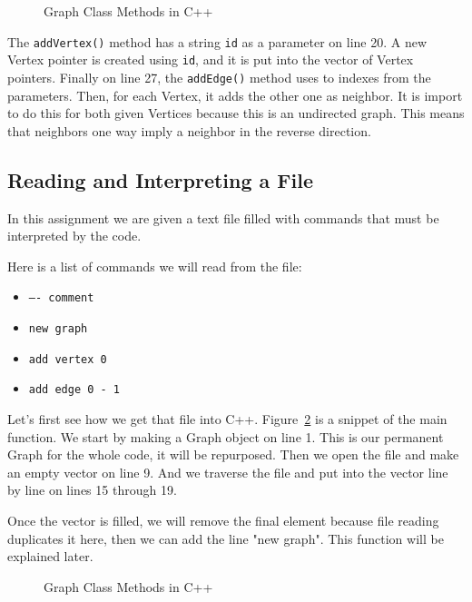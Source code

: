 \documentclass[letterpaper, 10pt,DIV=13]{scrartcl}
\numberwithin{equation}{section} %
\numberwithin{figure}{section} %
\numberwithin{table}{section} %
\begin{document}
\begin{figure}[ht] 
    \centering 
    
    \caption{Graph Class Methods in C++}
    \label{figure:GraphMethods}
\end{figure}


The \texttt{addVertex()} method has a string \texttt{id} as a parameter on line 20. A new Vertex pointer is created using \texttt{id}, and it is put into the vector of Vertex pointers. Finally on line 27, the \texttt{addEdge()} method uses to indexes from the parameters. Then, for each Vertex, it adds the other one as neighbor. It is import to do this for both given Vertices because this is an undirected graph. This means that neighbors one way imply a neighbor in the reverse direction.


\subsection{Reading and Interpreting a File}
In this assignment we are given a text file filled with commands that must be interpreted by the code. 

Here is a list of commands we will read from the file:
\begin{itemize}
    \item \texttt{---- comment}
    \item \texttt{new graph}
    \item \texttt{add vertex 0}
    \item \texttt{add edge 0 - 1 }
\end{itemize}

\pagebreak

Let's first see how we get that file into C++. Figure~\ref{figure:FileReading} is a snippet of the main function. We start by making a Graph object on line 1. This is our permanent Graph for the whole code, it will be repurposed. Then we open the file and make an empty vector on line 9. And we traverse the file and put into the vector line by line on lines 15 through 19.

Once the vector is filled, we will remove the final element because file reading duplicates it here, then we can add the line "new graph". This function will be explained later.





\begin{figure}[ht] 
    \centering 
    
    \caption{Graph Class Methods in C++}
    \label{figure:FileReading}
\end{figure}
\end{document}
